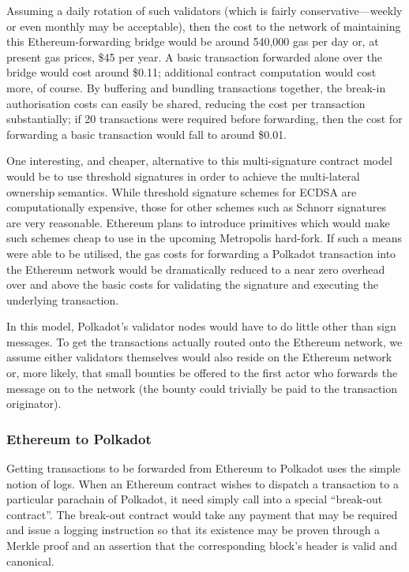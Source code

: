 \documentclass[9pt,oneside]{amsart}
\begin{document}
\begin{multicols}{2}
 Assuming a daily rotation of such validators (which is fairly conservative---weekly or even monthly may be acceptable), then the cost to the network of maintaining this Ethereum-forwarding bridge would be around 540,000 gas per day or, at present gas prices, \$45 per year. A basic transaction forwarded alone over the bridge would cost around \$0.11; additional contract computation would cost more, of course. By buffering and bundling transactions together, the break-in authorisation costs can easily be shared, reducing the cost per transaction substantially; if 20 transactions were required before forwarding, then the cost for forwarding a basic transaction would fall to around \$0.01.
 
 One interesting, and cheaper, alternative to this multi-signature contract model would be to use threshold signatures in order to achieve the multi-lateral ownership semantics. While threshold signature schemes for ECDSA are computationally expensive, those for other schemes such as Schnorr signatures are very reasonable. Ethereum plans to introduce primitives which would make such schemes cheap to use in the upcoming Metropolis hard-fork. If such a means were able to be utilised, the gas costs for forwarding a Polkadot transaction into the Ethereum network would be dramatically reduced to a near zero overhead over and above the basic costs for validating the signature and executing the underlying transaction.

 In this model, Polkadot's validator nodes would have to do little other than sign messages. To get the transactions actually routed onto the Ethereum network, we assume either validators themselves would also reside on the Ethereum network or, more likely, that small bounties be offered to the first actor who forwards the message on to the network (the bounty could trivially be paid to the transaction originator).

\subsubsection{Ethereum to Polkadot}\label{ethereum-to-disparity}

 Getting transactions to be forwarded from Ethereum to Polkadot uses the simple notion of logs. When an Ethereum contract wishes to dispatch a transaction to a particular parachain of Polkadot, it need simply call into a special ``break-out contract''. The break-out contract would take any payment that may be required and issue a logging instruction so that its existence may be proven through a Merkle proof and an assertion that the corresponding block's header is valid and canonical.


\end{multicols}
\end{document}
